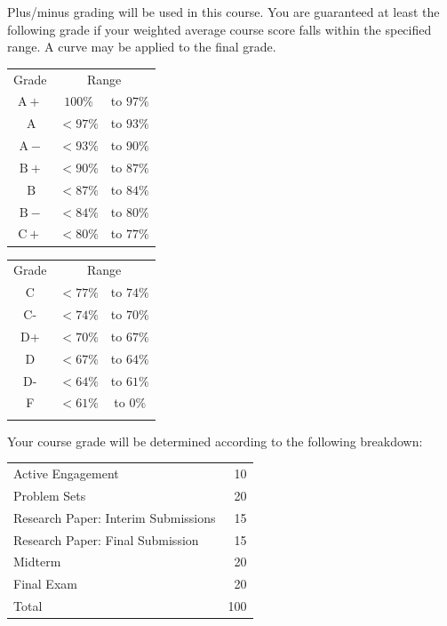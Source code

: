 \documentclass{syllabus}
\begin{document}
Plus/minus grading will be used in this course. You are guaranteed at least the following grade if your weighted average course score falls within the specified range. A curve may be applied to the final grade.

\begin{center}
\begin{minipage}[t]{0.75\textwidth}
\begin{tabular}{|ccc|}
\hline
Grade & \multicolumn{2}{c|}{Range} \\
$\mathrm{A}+$ & $100 \%$ & to $97 \%$ \\
$\mathrm{~A}$ & $<97 \%$ & to $93 \%$ \\
$\mathrm{~A}-$ & $<93 \%$ & to $90 \%$ \\
$\mathrm{~B}+$ & $<90 \%$ & to $87 \%$ \\
$\mathrm{~B}$ & $<87 \%$ & to $84 \%$ \\
$\mathrm{~B}-$ & $<84 \%$ & to $80 \%$ \\
$\mathrm{C}+$ & $<80 \%$ & to $77 \%$ \\
\hline
\end{tabular} \hspace{2cm}
\begin{tabular}{|ccc|}
\hline
Grade & \multicolumn{2}{c|}{Range} \\
C & $<77 \%$ & to $74 \%$ \\
C- & $<74 \%$ & to $70 \%$ \\
D+ & $<70 \%$ & to $67 \%$ \\
D & $<67 \%$ & to $64 \%$ \\
D- & $<64 \%$ & to $61 \%$ \\
F & $<61 \%$ & to $0 \%$ \\
 &  &  \\
\hline
\end{tabular}
\end{minipage}
\end{center} 

Your course grade will be determined according to the following breakdown:

\begin{center}
\begin{tabularx}{0.65\textwidth}{Xr}
\hline

Active Engagement & 10 \\
Problem Sets & 20 \\
Research Paper: Interim Submissions & 15 \\
Research Paper: Final Submission & 15 \\
Midterm & 20 \\
Final Exam & 20 \\
\hline
Total & 100 \\
\hline
\end{tabularx}
\end{center}
\end{document}
